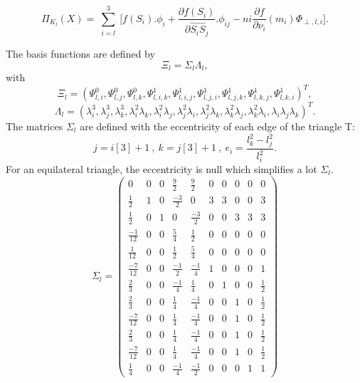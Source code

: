 \documentclass[proc]{edpsmath}
\begin{document}
\begin{equation*}
\Pi_{K_l} (X) = \sum \limits_{\substack{i=l }}^{3}{ [f(S_i).\phi_i +  \frac{\partial f(S_i)}{\partial  \overrightarrow{ S_i S_j } }.\phi_{ij} }   - ni \frac{\partial f}{\partial \nu_i}(m_i) \Phi_{\perp,l,i}].
\end{equation*} 

The basis functions are defined by 
\begin{equation*}
\Xi_l =  \Sigma_l \Lambda_l,
\end{equation*} 
 \noindent with
\begin{equation*}
  \Xi_l=(\Psi_{l,i}^0, \Psi_{l,j}^0, \Psi_{l,k}^0, \Psi_{l,i,k}^1,\Psi_{l,i,j}^1,\Psi_{l,j,i}^1,\Psi_{l,j,k}^1 ,\Psi_{l,k,j}^1,\Psi_{l,k,i}^1)^T,
\end{equation*} 
\begin{equation*}
  \Lambda_l = ( \lambda_i^3,\lambda_j^3,\lambda_k^3,\lambda_i^2\lambda_k,\lambda_i^2\lambda_j,\lambda_j^2\lambda_i,\lambda_j^2\lambda_k,\lambda_k^2\lambda_j,\lambda_k^2\lambda_i,\lambda_i\lambda_j\lambda_k)^T.
\end{equation*}  
  \noindent The matrices $\Sigma_l$ are defined with the eccentricity of each edge of the triangle T: 
\begin{equation*}
j=i[3]+1 ~,~ k=j[3]+1~,~ e_i = \frac{l_k^2 - l_j^2}{l_i^2}.
\end{equation*} 
For an equilateral triangle, the eccentricity is null which simplifies a lot $\Sigma_l$.
\begin{equation*}
\Sigma_l = 
\begin{pmatrix}
	0 & 0 & 0 & \frac{9}{2} & \frac{9}{2} & 0 & 0 & 0 & 0 & 0  \\
	\frac{1}{2} & 1 & 0 & \frac{-3}{2} & 0 & 3 & 3 & 0 & 0 & 3 \\
	\frac{1}{2} & 0 & 1 & 0 & \frac{-3}{2} & 0 & 0 & 3 & 3 & 3 \\	 
	\frac{-1}{12} & 0 & 0 & \frac{ 5}{4} & \frac{ 1}{2} & 0 & 0 & 0 & 0 & 0 \\	 
	\frac{ 1}{12} & 0 & 0 & \frac{ 1}{2} & \frac{ 5}{4} & 0 & 0 & 0 & 0 & 0 \\
	\frac{-7}{12} & 0 & 0 & \frac{-1}{2} & \frac{-1}{4} & 1 & 0 & 0 & 0 & 1 \\
    \frac{ 2}{3}& 0 & 0 & \frac{-1}{4} & \frac{ 1}{4} & 0 & 1 & 0 & 0 & \frac{1}{2} \\
	\frac{ 2}{3}& 0 & 0 & \frac{ 1}{4} & \frac{-1}{4} & 0 & 0 & 1 & 0 & \frac{1}{2} \\
    \frac{-7}{12} & 0 & 0 & \frac{ 1}{4} & \frac{-1}{4} & 0 & 0 & 1 & 0 & \frac{1}{2} \\
	\frac{ 2}{3}& 0 & 0 & \frac{ 1}{4} & \frac{-1}{4} & 0 & 0 & 1 & 0 & \frac{1}{2} \\
    \frac{-7}{12} & 0 & 0 & \frac{ 1}{4} & \frac{-1}{4} & 0 & 0 & 1 & 0 & \frac{1}{2} \\
	\frac{1}{4} & 0 & 0 & \frac{-1}{4} & \frac{-1}{2} & 0 & 0 & 0 & 1 & 1 
\end{pmatrix}
\end{equation*}
\end{document}
